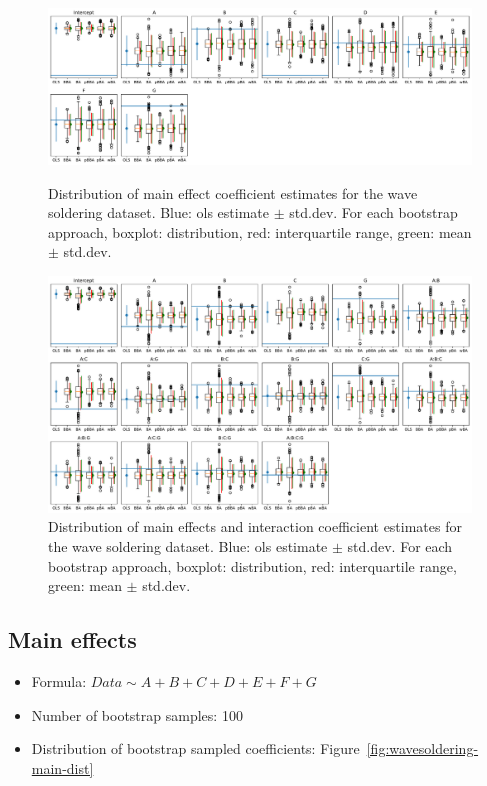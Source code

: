 \documentclass{article}
\begin{document}
\begin{figure}
    \includegraphics[width=\linewidth]{figures/wavesoldering-main-dist.pdf}
    \caption{Distribution of main effect coefficient estimates for the wave soldering dataset. 
        Blue: ols estimate $\pm$ std.dev. 
        For each bootstrap approach, boxplot: distribution, red: interquartile range, green: mean $\pm$ std.dev.}
    \label{fig:wavesoldering-main-dist}
    \includegraphics[width=\linewidth]{figures/wavesoldering-int-dist.pdf}
    \caption{Distribution of main effects and interaction coefficient estimates for the wave soldering dataset. 
        Blue: ols estimate $\pm$ std.dev. 
        For each bootstrap approach, boxplot: distribution, red: interquartile range, green: mean $\pm$ std.dev.}
    \label{fig:wavesoldering-main-int}
\end{figure}
\subsection{Main effects}
\begin{itemize}
    \item Formula: $Data \sim A + B + C + D + E + F + G$
    \item Number of bootstrap samples: 100
    \item Distribution of bootstrap sampled coefficients: Figure~\ref{fig:wavesoldering-main-dist}
\end{itemize}
\end{document}
